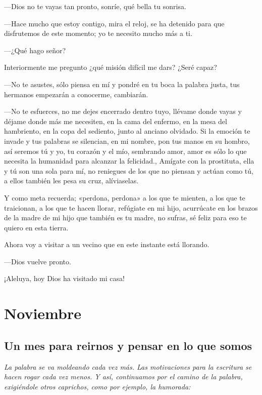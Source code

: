 \documentclass[11pt,twoside,openright,a5paper]{book}
\begin{document}
---Dios no te vayas tan pronto, sonríe, qué bella tu sonrisa.

---Hace mucho que estoy contigo, mira el reloj, se ha detenido para que disfrutemos de este momento; yo te necesito mucho más a ti.

---¿Qué hago señor?

Interiormente me pregunto ¿qué misión difícil me dars? ¿Seré capaz?

---No te asustes, sólo piensa en mí y pondré en tu boca la palabra justa, tus hermanos empezarán a conocerme, cambiarán.

---No te esfuerces, no me dejes encerrado dentro tuyo, llévame donde vayas y déjame donde más me necesiten, en la cama del enfermo, en la mesa del hambriento, en la copa del sediento, junto al anciano olvidado. Si la emoción te invade y tus palabras se silencian, en mi nombre, pon  tus manos en su hombro, así seremos tú y yo, tu corazón y el mío, sembrando amor, amor es sólo lo que necesita la humanidad para alcanzar la felicidad., Amígate con la prostituta, ella y tú son una sola para mí, no reniegues de los que no piensan y actúan como tú, a ellos también les pesa su cruz, alíviaselas.

Y como meta recuerda; «perdona, perdona» a los  que te mienten, a los que te traicionan, a los que te hacen llorar, refúgiate en mi hijo, acurrúcate en los brazos de la madre de mi hijo que también es tu madre, no sufras, sé feliz para eso te quiero en esta tierra.

Ahora voy a visitar a un vecino que en este instante está llorando.

---Dios vuelve pronto.

¡Aleluya, hoy Dios ha visitado mi casa!

\part*{Noviembre}

\chapter*{Un mes para reirnos y pensar en lo que somos}

\vspace{0.5cm}
\emph{La palabra se va moldeando cada vez más. Las motivaciones para la escritura se hacen rogar cada vez menos. Y así, continuamos por el camino de la palabra, exigiéndole otros caprichos, como por ejemplo, la humorada:}
\end{document}

